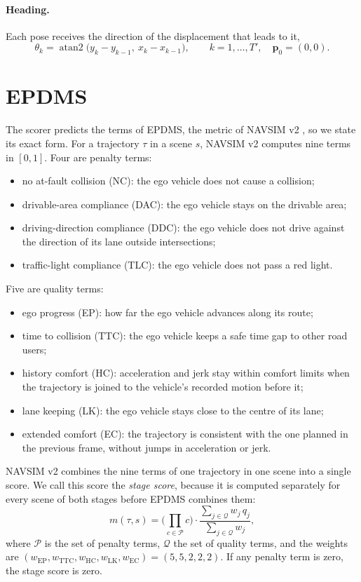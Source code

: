 \documentclass[11pt, a4paper, oneside]{book}
\begin{document}
\paragraph{Heading.} Each pose receives the direction of the displacement that leads to it,
\begin{equation}
  \theta_k=\operatorname{atan2}\big(y_k-y_{k-1},\ x_k-x_{k-1}\big),\qquad
  k=1,\dots,T',\quad \mathbf{p}_0=(0,0).
\end{equation}



\section{EPDMS}
\label{sec:epdms}
The scorer predicts the terms of EPDMS, the metric of NAVSIM v2 \cite{pseudosim}, so we state
its exact form. For a trajectory $\tau$ in a scene $s$, NAVSIM v2 computes nine terms in
$[0,1]$. Four are penalty terms:
\begin{itemize}
  \item no at-fault collision (NC): the ego vehicle does not cause a collision;
  \item drivable-area compliance (DAC): the ego vehicle stays on the drivable area;
  \item driving-direction compliance (DDC): the ego vehicle does not drive against the
  direction of its lane outside intersections;
  \item traffic-light compliance (TLC): the ego vehicle does not pass a red light.
\end{itemize}
Five are quality terms:
\begin{itemize}
  \item ego progress (EP): how far the ego vehicle advances along its route;
  \item time to collision (TTC): the ego vehicle keeps a safe time gap to other road users;
  \item history comfort (HC): acceleration and jerk stay within comfort limits when the
  trajectory is joined to the vehicle's recorded motion before it;
  \item lane keeping (LK): the ego vehicle stays close to the centre of its lane;
  \item extended comfort (EC): the trajectory is consistent with the one planned in the
  previous frame, without jumps in acceleration or jerk.
\end{itemize}
NAVSIM v2 combines the nine terms of one trajectory in one scene into a single score. We call
this score the \emph{stage score}, because it is computed separately for every scene of both
stages before EPDMS combines them:
\begin{equation}
  m(\tau,s)=\Big(\prod_{c\in\mathcal{P}} c\Big)\cdot\frac{\sum_{j\in\mathcal{Q}} w_j\,q_j}
  {\sum_{j\in\mathcal{Q}} w_j},
  \label{eq:epdms}
\end{equation}
where $\mathcal{P}$ is the set of penalty terms, $\mathcal{Q}$ the set of quality terms, and
the weights are $(w_{\mathrm{EP}},w_{\mathrm{TTC}},w_{\mathrm{HC}},w_{\mathrm{LK}},w_{\mathrm{EC}})
=(5,5,2,2,2)$. If any penalty term is zero, the stage score is zero.
\end{document}
